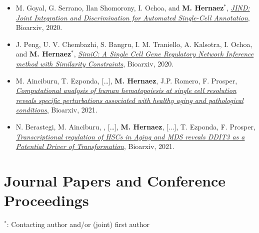 \documentclass[11pt,a4paper,sans]{moderncv}        %
\begin{document}
\begin{itemize}

\item M. Goyal, G. Serrano, Ilan Shomorony,  I. Ochoa, and  \textbf{M. Hernaez}$^{\ast}$, \href{https://doi.org/10.1101/2020.10.06.327601}{\textsl{JIND: Joint Integration and Discrimination for Automated Single-Cell Annotation}}, Bioarxiv, 2020.\\

\item J. Peng, U. V. Chembazhi, S. Bangru, I. M. Traniello, A. Kalsotra, I. Ochoa, and  \textbf{M. Hernaez}$^{\ast}$, \href{https://www.biorxiv.org/content/10.1101/2020.04.03.023002v1}{\textsl{SimiC: A Single Cell Gene Regulatory Network Inference method with Similarity Constraints}}, Bioarxiv, 2020.\\

\item M. Ainciburu, T. Ezponda, […], \textbf{M. Hernaez}, J.P. Romero, F. Prosper, \href{https://www.biorxiv.org/content/10.1101/2021.07.30.454542v1.abstract}{\textsl{Computational analysis of human hematopoiesis at single cell resolution reveals specific perturbations associated with healthy aging and pathological conditions},} Bioarxiv, 2021.\\

\item N. Berastegi, M. Ainciburu, , […], \textbf{M. Hernaez}, [...],  T. Ezponda, F. Prosper, \href{https://www.biorxiv.org/content/10.1101/2021.09.08.459384v1.full}{\textsl{Transcriptional regulation of HSCs in Aging and MDS reveals DDIT3 as a Potential Driver of Transformation}}, Bioarxiv, 2021.\\

\end{itemize}

\section{Journal Papers and Conference Proceedings }
$^{\ast}$: Contacting author and/or (joint) first author\\
\end{document}
